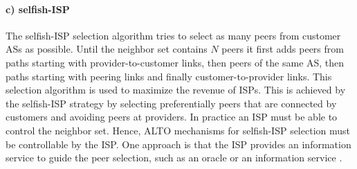 \paragraph{c) selfish-ISP}
The selfish-ISP selection algorithm tries to select as many peers from customer ASs as possible. Until the neighbor set contains $N$ peers it first adds peers from paths starting with provider-to-customer links, then peers of the same AS, then paths starting with peering links and finally customer-to-provider links.
This selection algorithm is used to maximize the revenue of ISPs. This is achieved by the selfish-ISP strategy by selecting preferentially peers that are connected by customers and avoiding peers at providers. In practice an ISP must be able to control the neighbor set. Hence, ALTO mechanisms for selfish-ISP selection must be controllable by the ISP. One approach is that the ISP provides an information service to guide the peer selection, such as an oracle \cite{Aggarwal2007} or an information service \cite{hossfia}.


